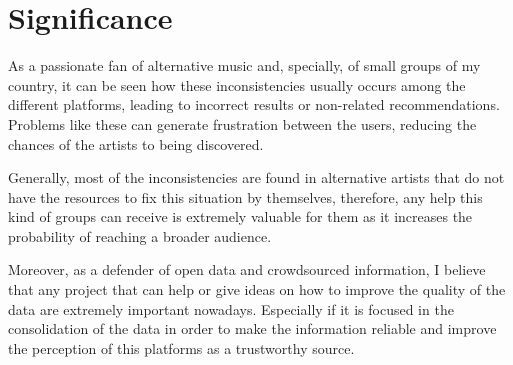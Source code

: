 \section{Significance}
As a passionate fan of alternative music and, specially, of small groups of my country, it can be seen how these inconsistencies usually occurs among the different platforms, leading to incorrect results or non-related recommendations.
Problems like these can generate frustration between the users, reducing the chances of the artists to being discovered. 

Generally, most of the inconsistencies are found in alternative artists that do not have the resources to fix this situation by themselves, therefore, any help this kind of groups can receive is extremely valuable for them as it increases the probability of reaching a broader audience.

Moreover, as a defender of open data and crowdsourced information, I believe that any project that can help or give ideas on how to improve the quality of the data are extremely important nowadays.
Especially if it is focused in the consolidation of the data in order to make the information reliable and improve the perception of this platforms as a trustworthy source.